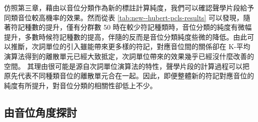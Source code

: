         仿照第三章，藉由以音位分類作為新的標註計算純度，我們可以確認聲學片段給予同類音位較高機率的效果。然而從表 \ref{tab:new--hubert-pcls-results} 可以發現，隨著符記種數的提升，僅有分群數 50 時在較少符記種類時，音位分類的純度有微幅提升，多數時候符記種數的提高，伴隨的反而是音位分類純度些微的降低。由此可以推斷，次詞單位的引入雖能帶來更多樣的符記，對應音位間的關係卻在 K-平均演算法得到的離散單元已經大致抵定，次詞單位帶來的效果幾乎已經沒什麼改善的空間。
其理由很可能是源自次詞單位演算法的特性，聲學片段的計算過程可以把原先代表不同種類音位的離散單元合在一起。因此，即便整體新的符記對應音位的純度有所提升，對音位分類的相關性卻低上不少。  

\subsection{由音位角度探討}


